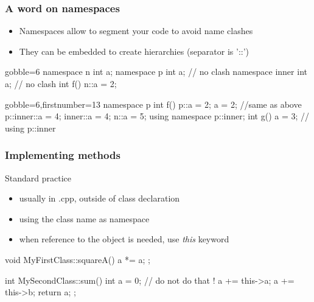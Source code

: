 \begin{frame}[fragile]
  \frametitle{A word on namespaces}
  \begin{itemize}
  \item Namespaces allow to segment your code to avoid name clashes
  \item They can be embedded to create hierarchies (separator is '::')
  \end{itemize}
  \begin{multicols}{2}
    \begin{cppcode*}{gobble=6}
      namespace n {
        int a;
      }      
      namespace p {
        int a; // no clash
        namespace inner {
          int a; // no clash
        }
      }
      int f() {
        n::a = 2;
      }
    \end{cppcode*}
    \columnbreak
    \begin{cppcode*}{gobble=6,firstnumber=13}
      namespace p {
        int f() {
          p::a = 2;
          a = 2;  //same as above
          p::inner::a = 4;
          inner::a = 4;
          n::a = 5;
        }
      }
      using namespace p::inner;
      int g() {
        a = 3; // using p::inner
      }
  \end{cppcode*}
  \end{multicols}
\end{frame}

\begin{frame}[fragile]
  \frametitle{Implementing methods}
  \begin{block}{Standard practice}
    \begin{itemize}
    \item usually in .cpp, outside of class declaration
    \item using the class name as namespace
    \item when reference to the object is needed, use {\it this} keyword
    \end{itemize}
  \end{block}
  \begin{cppcode*}{}
    void MyFirstClass::squareA() {
      a *= a;
    };

    int MySecondClass::sum() {
      int a = 0; // do not do that !
      a += this->a;
      a += this->b;
      return a;
    };
  \end{cppcode*}
\end{frame}

